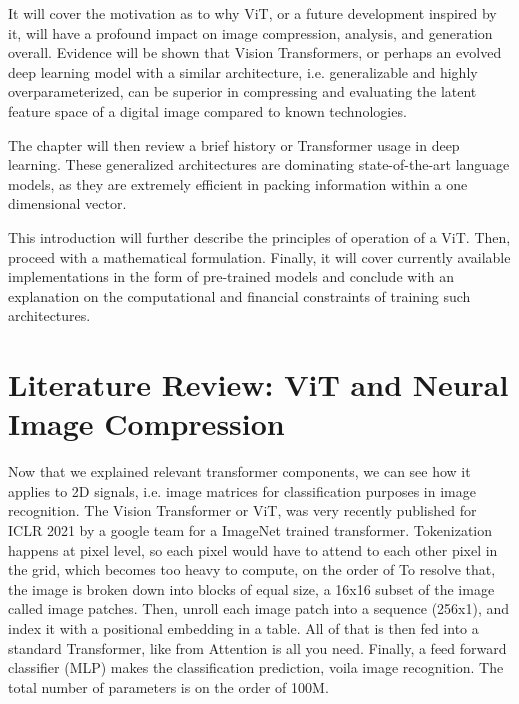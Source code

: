 \documentclass[pdftex,11pt,titlepage,twoside,openright]{report}
\begin{document}
It will cover the motivation as to why ViT, or a future development inspired by it,
will have a profound impact on image compression, analysis, and generation overall.
Evidence will be shown that Vision Transformers, or perhaps an evolved deep learning model with a
similar architecture, i.e. generalizable and highly overparameterized, can be superior in
compressing and evaluating the latent feature space of a digital image compared to known
technologies.

The chapter will then review a brief history or Transformer usage in deep learning.
These generalized architectures are dominating state-of-the-art language models,
as they are extremely efficient in packing information within a one dimensional vector.

This introduction will further describe the principles of operation of a ViT. Then, proceed with
a mathematical formulation. Finally, it will cover currently available implementations
in the form of pre-trained models and conclude with an explanation on the computational and
financial constraints of training such architectures.

\newpage



\cleardoublepage
\chapter{Literature Review: ViT and Neural Image Compression}

Now that we explained relevant transformer components, we can see how it applies to 2D signals, i.e. image matrices for classification purposes in image recognition.
The Vision Transformer or ViT, was very recently published for ICLR 2021 by a google team for a ImageNet trained transformer.
Tokenization happens at pixel level, so each pixel would have to attend to  each other pixel in the grid, which becomes too heavy to compute, on the order of
To resolve that, the image is broken down into blocks of equal size, a 16x16 subset of the image called image patches. Then, unroll each image patch into a sequence (256x1), and index it with a positional embedding in a table. All of that is then fed into a standard Transformer, like from Attention is all you need. Finally, a feed forward classifier (MLP) makes the classification prediction, voila image recognition.
The total number of parameters is on the order of 100M.

\newpage


\cleardoublepage
\end{document}
